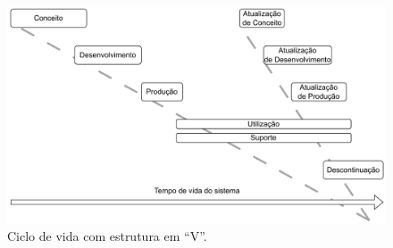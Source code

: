 	\begin{figure}[h]
		\centering
		\includegraphics[width=\textwidth]{./figuras/veeLifeCycle.pdf}
		\caption{Ciclo de vida com estrutura em ``V''.}
		\label{fig:revisao:veeLifeCycle}
	\end{figure}


